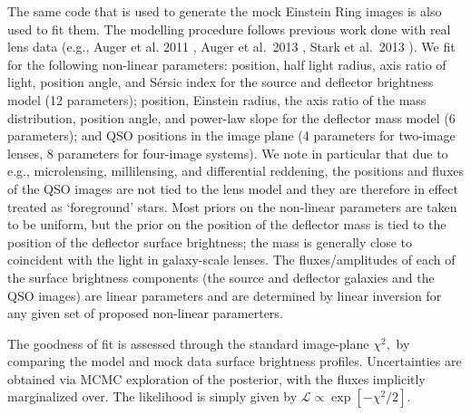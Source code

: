 \documentclass[a4paper,11pt]{article}
\begin{document}
The same code that is used to generate the mock Einstein Ring images
is also used to fit them. The
modelling procedure follows previous work done with real lens data (e.g., Auger et al. 2011
\cite{2011MNRAS.411L...6A}, Auger et al.~2013 \cite{2013MNRAS.436..503A}, Stark et al.~2013
\cite{2013MNRAS.436.1040S}).
We fit for the following non-linear parameters: position, half light radius, axis
ratio of light, position angle, and S{\'e}rsic index for the
source and deflector brightness model (12 parameters); position, Einstein radius, the
axis ratio of the mass distribution, position angle, and power-law
slope for the deflector mass model (6 parameters); and QSO positions in the image
plane (4 parameters for two-image lenses, 8 parameters for four-image systems). We note in particular
that due to e.g., microlensing, millilensing, and differential reddening, the
positions and fluxes of the QSO images are not tied to the lens model and
they are therefore in effect treated as `foreground' stars. Most priors on the non-linear
parameters are taken to be uniform, but the prior on the position of the deflector
mass is tied to the position of the deflector surface brightness;
the mass is generally close to coincident with the light in galaxy-scale lenses.
The fluxes/amplitudes of each of the surface brightness components
(the source and deflector galaxies and the QSO images) are linear parameters and are determined
by linear inversion for any given set of proposed non-linear paramerters.


The goodness of fit is assessed through the standard
image-plane $\chi^{2},$ by comparing the model and mock data surface
brightness profiles.  Uncertainties are obtained via MCMC exploration
of the posterior, with the fluxes implicitly marginalized over. The likelihood is simply given by
$\mathcal{L}\propto\exp[-\chi^{2}/2]$.
%
%
\end{document}
